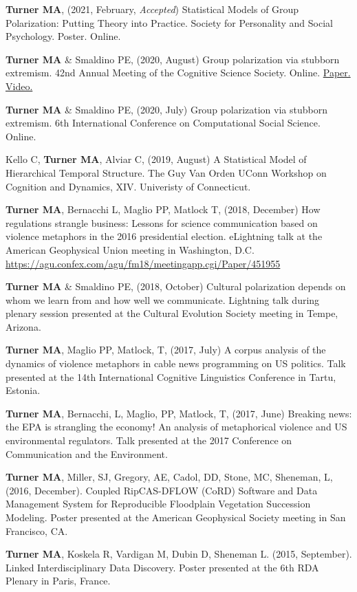 \documentclass[letterpaper,11pt,oneside]{article}
\begin{document}
  \begin{hangparas}{0.25in}{1}
    \textbf{Turner MA}, (2021, February, \emph{Accepted}) Statistical Models of Group Polarization: Putting Theory into Practice. Society for Personality and Social Psychology. Poster. Online.

    \textbf{Turner MA} \& Smaldino PE, (2020, August) Group polarization via stubborn extremism. 42nd Annual Meeting of the Cognitive Science Society. Online. \href{https://www.researchgate.net/publication/342153646_Stubborn_extremism_as_a_potential_pathway_to_group_polarization}{Paper.} \href{https://youtu.be/i5PHjwu1p40}{Video.}

   \textbf{Turner MA} \& Smaldino PE, (2020, July) Group polarization via stubborn extremism. 6th International Conference on Computational Social Science. Online.

Kello C, \textbf{Turner MA}, Alviar C, (2019, August) A Statistical Model of Hierarchical Temporal Structure. The Guy Van Orden UConn Workshop on Cognition and Dynamics, XIV. Univeristy of Connecticut.

\textbf{Turner MA}, Bernacchi L, Maglio PP, Matlock T, (2018, December) How regulations strangle business: Lessons for science communication based on violence metaphors in the 2016 presidential election. eLightning talk at the American Geophysical Union meeting in Washington, D.C. \url{https://agu.confex.com/agu/fm18/meetingapp.cgi/Paper/451955}

\textbf{Turner MA} \& Smaldino PE, (2018, October) Cultural polarization depends on whom we learn from and how well we communicate. Lightning talk during plenary session presented at the Cultural Evolution Society meeting in Tempe, Arizona.

\textbf{Turner MA}, Maglio PP, Matlock, T, (2017, July) A corpus analysis of the dynamics of violence metaphors in cable news programming on US politics. Talk presented at the 14th International Cognitive Linguistics Conference in Tartu, Estonia.

\textbf{Turner MA}, Bernacchi, L, Maglio, PP, Matlock, T, (2017, June) Breaking news: the EPA is strangling the economy! An analysis of metaphorical violence and US environmental regulators. Talk presented at the 2017 Conference on Communication and the Environment.

\textbf{Turner MA}, Miller, SJ, Gregory, AE, Cadol, DD, Stone, MC, Sheneman, L, (2016, December). Coupled RipCAS-DFLOW (CoRD) Software and Data Management System for Reproducible Floodplain Vegetation Succession Modeling. Poster presented at the American Geophysical Society meeting in San Francisco, CA.

\textbf{Turner MA}, Koskela R, Vardigan M, Dubin D, Sheneman L. (2015, September). Linked Interdisciplinary Data Discovery. Poster presented at the 6th RDA Plenary in Paris, France. 
  \end{hangparas}
\end{document}

